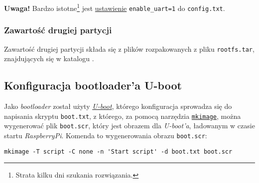\documentclass{article}
\begin{document}
\textbf{Uwaga!} Bardzo istotne\footnote{Strata kilku dni szukania rozwiązania.} jest \href{https://www.raspberrypi.org/forums/viewtopic.php?f=28&t=141195}{ustawienie} \texttt{enable\_uart=1} do \texttt{config.txt}.


\subsubsection{Zawartość drugiej partycji}

Zawartość drugiej partycji składa się z plików rozpakowanych z pliku \texttt{rootfs.tar}, znajdujących się w katalogu .




\subsection{Konfiguracja bootloader'a U-boot}

Jako \emph{bootloader} został użyty \href{http://www.denx.de/wiki/u-boot/}{\emph{U-boot}}, którego konfiguracja sprowadza się do napisania skryptu \texttt{boot.txt}, z którego, za pomocą narzędzia \href{http://linux.die.net/man/1/mkimage}{\texttt{mkimage}}, można wygenerować plik \texttt{boot.scr}, który jest obrazem dla \emph{U-boot'a}, ładowanym w czasie startu \emph{RaspberryPi}. Komenda to wygenerowania obrazu \texttt{boot.scr}:
\begin{verbatim}
mkimage -T script -C none -n 'Start script' -d boot.txt boot.scr
\end{verbatim}
\end{document}
